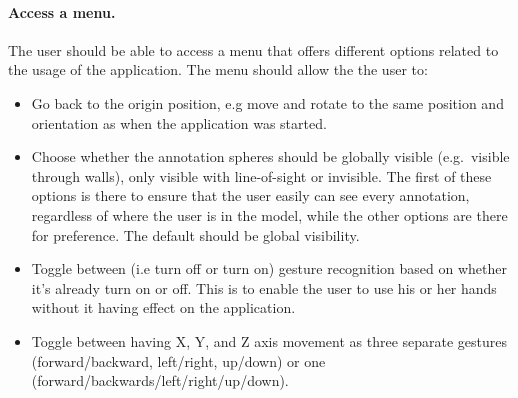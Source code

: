 \paragraph{Access a menu.} The user should be able to access a menu that offers different options related to the usage of the application.
The menu should allow the the user to:
\begin{itemize}
	\item Go back to the origin position, e.g move and rotate to the same position and orientation as when the application was started.
	\item Choose whether the annotation spheres should be globally visible (e.g.~visible through walls), only visible with line-of-sight or invisible.
		  The first of these options is there to ensure that the user easily can see every annotation, regardless of where the user is in the model,
		  while the other options are there for preference. The default should be global visibility.
	\item Toggle between (i.e turn off or turn on) gesture recognition based on whether it's already turn on or off.
		  This is to enable the user to use his or her hands without it having effect on the application. 
	\item Toggle between having X, Y, and Z axis movement as three separate gestures (forward/backward, left/right, up/down) or one (forward/backwards/left/right/up/down). 
\end{itemize}